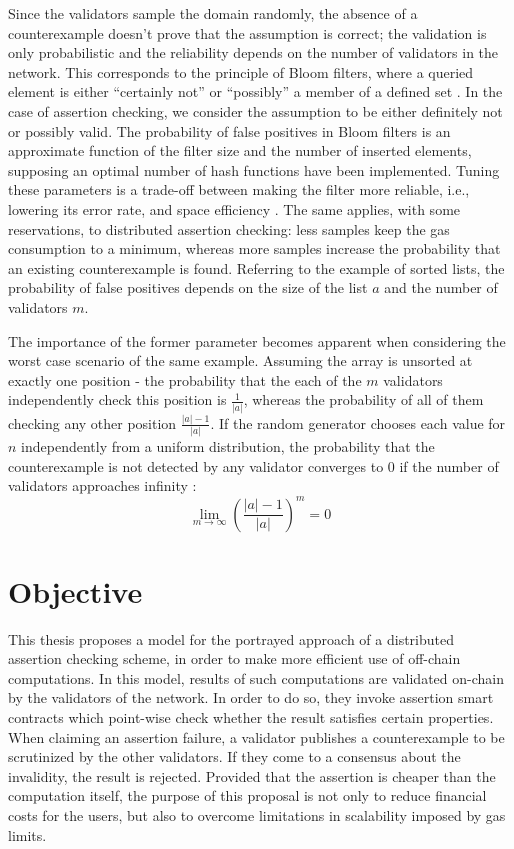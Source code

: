 Since the validators sample the domain randomly, the absence of a counterexample doesn't prove that the assumption is correct; the validation is only probabilistic and the reliability depends on the number of validators in the network. This corresponds to the principle of Bloom filters, where a queried element is either ``certainly not'' or ``possibly'' a member of a defined set \cite{blustein_bloom_2002}. In the case of assertion checking, we consider the assumption to be either definitely not or possibly valid. The probability of false positives in Bloom filters is an approximate function of the filter size and the number of inserted elements, supposing an optimal number of hash functions have been implemented. Tuning these parameters is a trade-off between making the filter more reliable, i.e., lowering its error rate, and space efficiency \cite{blustein_bloom_2002}. The same applies, with some reservations, to distributed assertion checking: less samples keep the gas consumption to a minimum, whereas more samples increase the probability that an existing counterexample is found. Referring to the example of sorted lists,  the probability of false positives depends on the size of the list $a$ and the number of validators $m$.

The importance of the former parameter becomes apparent when considering the worst case scenario of the same example. Assuming the array is unsorted at exactly one position - the probability that the each of the $m$ validators independently check this position is $\frac{1}{|a|}$, whereas the probability of all of them checking any other position $\frac{|a|-1}{|a|}$. If the random generator chooses each value for $n$ independently from a uniform distribution, the probability that the counterexample is not detected by any validator converges to 0 if the number of validators approaches infinity \cite{thiemann_2020}:
\begin{equation}\label{eq:limes_validators}
	\lim_{m\to\infty} \left(\frac{|a|-1}{|a|}\right)^m = 0
\end{equation}

\section{Objective}
This thesis proposes a model for the portrayed approach of a distributed assertion checking scheme, in order to make more efficient use of off-chain computations. In this model, results of such computations are validated on-chain by the validators of the network. In order to do so, they invoke assertion smart contracts which point-wise check whether the result satisfies certain properties. When claiming an assertion failure, a validator publishes a counterexample to be scrutinized by the other validators. If they come to a consensus about the invalidity, the result is rejected. Provided that the assertion is cheaper than the computation itself, the purpose of this proposal is not only to reduce financial costs for the users, but also to overcome limitations in scalability imposed by gas limits.

